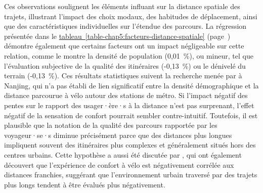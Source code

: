 \begin{refsegment}
Ces observations soulignent les éléments influant sur la distance spatiale des trajets, illustrant l'impact des choix modaux, des habitudes de déplacement, ainsi que des caractéristiques individuelles sur l'étendue des parcours. La régression présentée dans le \hyperref[table-chap5:facteurs-distance-spatiale]{tableau~\ref{table-chap5:facteurs-distance-spatiale}} (page~\pageref{table-chap5:facteurs-distance-spatiale}) démontre également que certains facteurs ont un impact négligeable sur cette relation, comme le montre la densité de population (0,01~\%), ou mineur, tel que l'évaluation subjective de la qualité des itinéraires (-0,13~\%) ou le dénivelé du terrain (-0,13~\%). Ces résultats statistiques suivent la recherche menée par \textcolor{blue}{\textcite[181]{gan_associations_2021}} à Nanjing, qui n'a pas établi de lien significatif entre la densité démographique et la distance parcourue à vélo autour des stations de métro. Si l'impact négatif des pentes sur le rapport des usager·ère·s à la distance n'est pas surprenant, l'effet négatif de la sensation de confort pourrait sembler contre-intuitif. Toutefois, il est plausible que la notation de la qualité des parcours rapportée par les voyageur·se·s diminue précisément parce que des distances plus longues impliquent souvent des itinéraires plus complexes et généralement situés hors des centres urbains. Cette hypothèse a aussi été discutée par \textcolor{blue}{\textcite[185]{gan_associations_2021}}, qui ont également découvert que l'expérience de confort à vélo est négativement corrélée aux distances franchies, suggérant que l'environnement urbain traversé par des trajets plus longs tendent à être évalués plus négativement.%


\end{refsegment}
